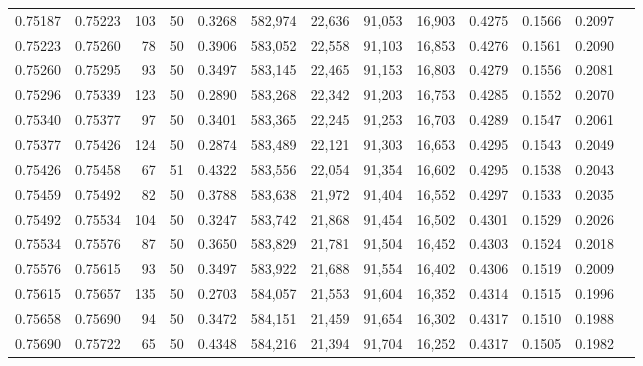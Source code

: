 \begin{tabular}{rrrrrrrrrrrrr}
0.75187 & 0.75223 &   103 &  50 &                                     0.3268 & 582,974 &  22,636 &  91,053 &  16,903 & 0.4275 & 0.1566 & 0.2097 \\
0.75223 & 0.75260 &    78 &  50 &                                     0.3906 & 583,052 &  22,558 &  91,103 &  16,853 & 0.4276 & 0.1561 & 0.2090 \\
0.75260 & 0.75295 &    93 &  50 &                                     0.3497 & 583,145 &  22,465 &  91,153 &  16,803 & 0.4279 & 0.1556 & 0.2081 \\
0.75296 & 0.75339 &   123 &  50 &                                     0.2890 & 583,268 &  22,342 &  91,203 &  16,753 & 0.4285 & 0.1552 & 0.2070 \\
0.75340 & 0.75377 &    97 &  50 &                                     0.3401 & 583,365 &  22,245 &  91,253 &  16,703 & 0.4289 & 0.1547 & 0.2061 \\
0.75377 & 0.75426 &   124 &  50 &                                     0.2874 & 583,489 &  22,121 &  91,303 &  16,653 & 0.4295 & 0.1543 & 0.2049 \\
0.75426 & 0.75458 &    67 &  51 &                                     0.4322 & 583,556 &  22,054 &  91,354 &  16,602 & 0.4295 & 0.1538 & 0.2043 \\
0.75459 & 0.75492 &    82 &  50 &                                     0.3788 & 583,638 &  21,972 &  91,404 &  16,552 & 0.4297 & 0.1533 & 0.2035 \\
0.75492 & 0.75534 &   104 &  50 &                                     0.3247 & 583,742 &  21,868 &  91,454 &  16,502 & 0.4301 & 0.1529 & 0.2026 \\
0.75534 & 0.75576 &    87 &  50 &                                     0.3650 & 583,829 &  21,781 &  91,504 &  16,452 & 0.4303 & 0.1524 & 0.2018 \\
0.75576 & 0.75615 &    93 &  50 &                                     0.3497 & 583,922 &  21,688 &  91,554 &  16,402 & 0.4306 & 0.1519 & 0.2009 \\
0.75615 & 0.75657 &   135 &  50 &                                     0.2703 & 584,057 &  21,553 &  91,604 &  16,352 & 0.4314 & 0.1515 & 0.1996 \\
0.75658 & 0.75690 &    94 &  50 &                                     0.3472 & 584,151 &  21,459 &  91,654 &  16,302 & 0.4317 & 0.1510 & 0.1988 \\
0.75690 & 0.75722 &    65 &  50 &                                     0.4348 & 584,216 &  21,394 &  91,704 &  16,252 & 0.4317 & 0.1505 & 0.1982 \\

\end{tabular}
